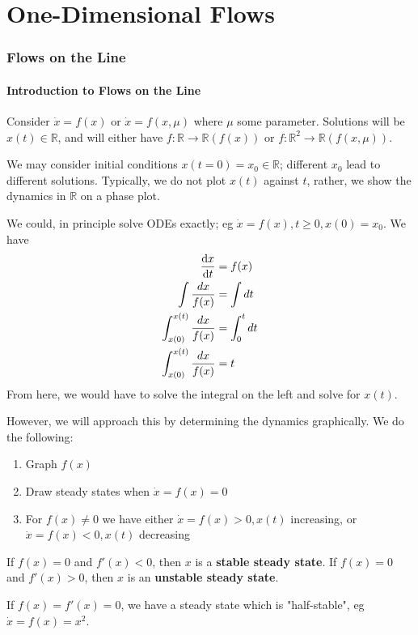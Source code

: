 \documentclass[12pt, oneside]{article}
\begin{document}
\newpage
\part{One-Dimensional Flows}
\section{Flows on the Line}

\subsection{Introduction to Flows on the Line}

Consider $\dot{x} = f(x)$ or $\dot{x} = f(x, \mu)$ where $\mu$ some parameter. Solutions will be $x(t) \in \mathbb{R}$, and will either have $f: \mathbb{R} \to \mathbb{R} (f(x))$ or $f: \mathbb{R}^2 \to \mathbb{R} (f(x,\mu))$.

We may consider initial conditions $x(t=0) = x_0 \in \mathbb{R}$; different $x_0$ lead to different solutions. Typically, we do not plot $x(t)$ against $t$, rather, we show the dynamics in $\mathbb{R}$ on a phase plot.

We could, in principle solve ODEs exactly; eg $\dot{x} =f(x), t \geq 0, x(0) = x_0$. We have \begin{align*}
  \dv{x}{t} &= f(x)\\
  \int \frac{dx}{f(x)} &= \int dt\\
  \int_{x(0)}^{x(t)} \frac{dx}{f(x)} &= \int_0^t dt\\
  \int_{x(0)}^{x(t)} \frac{dx}{f(x)} &= t
\end{align*}
From here, we would have to solve the integral on the left and solve for $x(t)$.

However, we will approach this by determining the dynamics graphically. We do the following:

\begin{enumerate}
  \item Graph $f(x)$
  \item Draw steady states when $\dot{x} = f(x) = 0$
  \item For $f(x) \neq 0$ we have either $\dot{x} = f(x) > 0, x(t)$ increasing, or $\dot{x} = f(x) < 0, x(t)$ decreasing
\end{enumerate}

\begin{remark}
  If $f(x) = 0$ and $f'(x) < 0$, then $x$ is a \textbf{stable steady state}. If $f(x) = 0$ and $f'(x) > 0$, then $x$ is an \textbf{unstable steady state}.

  If $f(x) = f'(x) = 0$, we have a steady state which is "half-stable", eg $\dot{x} = f(x) = x^2$.
\end{remark}
\end{document}
